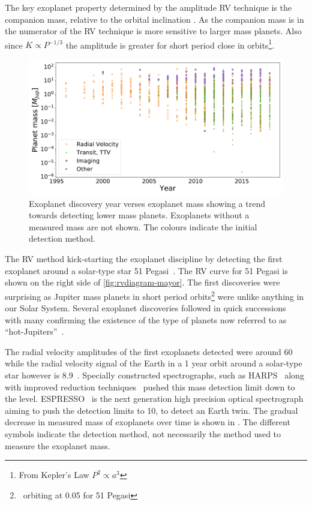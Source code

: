 The key exoplanet property determined by the amplitude {RV} technique is the companion mass, relative to the orbital inclination \Mpsini.
As the companion mass is in the numerator of  the {RV} technique is more sensitive to larger mass planets.
Also since $K \propto P^{-1/3}$ the amplitude is greater for short period close in orbits\footnote{From Kepler's Law ${P}^{2}\propto {a}^{3}$}.

\begin{figure}
    \centering
    \includegraphics[width=0.7\linewidth]{figures/introduction/exoplanetEU_year_mass.pdf}
    \caption{Exoplanet discovery year verses exoplanet mass showing a trend towards detecting lower mass planets.
        Exoplanets without a measured mass are not shown.
        The colours indicate the initial detection method.}
    \label{fig:exoplaneteuyearmass}
\end{figure}

The RV method  kick-starting the exoplanet discipline by detecting the first exoplanet around a solar-type star {51 Pegasi}~\citep{mayor_jupitermass_1995}.
The RV curve for {51 Pegasi} is shown on the right side of \ref{fig:rvdiagram-mayor}.
The first discoveries were surprising as Jupiter mass planets in short period orbits\footnote{\,\Mjup{} orbiting at 0.05\AU{} for {51 Pegasi}} were unlike anything in our Solar System.
Several exoplanet discoveries followed in quick successions~\citep[e.g.][]{butler_planet_1996, marcy_planetary_1996} with many confirming the existence of the type of planets now referred to as ``hot-Jupiters''~\citep{butler_three_1997, charbonneau_detection_2000}.

The radial velocity amplitudes of the first exoplanets detected were around 60\mps{} while
the radial velocity signal of the Earth in a 1 year orbit around a solar-type star however is 8.9\cmps{}~\citep{figueira_radial_2010}.
Specially constructed spectrographs, such as HARPS~\citep{mayor_setting_2003} along with improved reduction techniques~\citep{lovis_new_2007} pushed this mass detection limit down to the \mps{} level.
ESPRESSO~\citep{pepe_espresso_2014, megevand_espresso_2014} is the next generation high precision optical spectrograph aiming to push the detection limits to 10\cmps, to detect an Earth twin.
The gradual decrease in measured mass of exoplanets over time is shown in .
The different symbols indicate the detection method, not necessarily the method used to measure the exoplanet mass.

